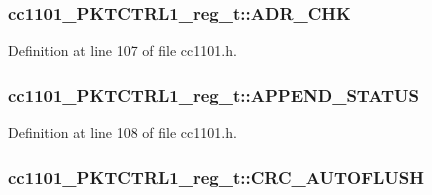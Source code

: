 \subsubsection[{\texorpdfstring{A\+D\+R\+\_\+\+C\+HK}{ADR_CHK}}]{ cc1101\+\_\+\+P\+K\+T\+C\+T\+R\+L1\+\_\+reg\+\_\+t\+::\+A\+D\+R\+\_\+\+C\+HK}\hypertarget{structcc1101___p_k_t_c_t_r_l1__reg__t_adec11a2a1613d5300121a232d1469583}{}\label{structcc1101___p_k_t_c_t_r_l1__reg__t_adec11a2a1613d5300121a232d1469583}


Definition at line 107 of file cc1101.\+h.

\subsubsection[{\texorpdfstring{A\+P\+P\+E\+N\+D\+\_\+\+S\+T\+A\+T\+US}{APPEND_STATUS}}]{ cc1101\+\_\+\+P\+K\+T\+C\+T\+R\+L1\+\_\+reg\+\_\+t\+::\+A\+P\+P\+E\+N\+D\+\_\+\+S\+T\+A\+T\+US}\hypertarget{structcc1101___p_k_t_c_t_r_l1__reg__t_adef6275b1e7903c6d473808f77f16d5b}{}\label{structcc1101___p_k_t_c_t_r_l1__reg__t_adef6275b1e7903c6d473808f77f16d5b}


Definition at line 108 of file cc1101.\+h.

\subsubsection[{\texorpdfstring{C\+R\+C\+\_\+\+A\+U\+T\+O\+F\+L\+U\+SH}{CRC_AUTOFLUSH}}]{ cc1101\+\_\+\+P\+K\+T\+C\+T\+R\+L1\+\_\+reg\+\_\+t\+::\+C\+R\+C\+\_\+\+A\+U\+T\+O\+F\+L\+U\+SH}\hypertarget{structcc1101___p_k_t_c_t_r_l1__reg__t_a0598b797936e538225205c2ccf419f31}{}\label{structcc1101___p_k_t_c_t_r_l1__reg__t_a0598b797936e538225205c2ccf419f31}


